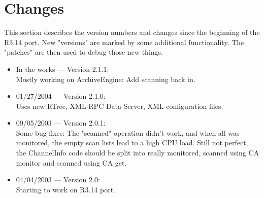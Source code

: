 \section{Changes}

This section describes the version numbers and changes since
the beginning of the R3.14 port.
New  "versions"  are  marked  by some additional functionality. The
"patches" are then used to debug those new things.

\begin{itemize}

\item In the works --- Version 2.1.1:\\
Mostly working on ArchiveEngine: Add scanning back in.

\item 01/27/2004 --- Version 2.1.0:\\
Uses new RTree, XML-RPC Data Server, XML configuration files.

\item 09/05/2003 --- Version 2.0.1:\\
Some bug fixes:
The  "scanned"  operation didn't work, and when all was monitored,
the  empty  scan lists lead to a high CPU load. Still not perfect,
the  ChannelInfo  code  should  be  split  into  really monitored,
scanned using CA monitor and scanned using CA get.

\item 04/04/2003 --- Version 2.0:\\
Starting to work on R3.14 port.
\end{itemize}
